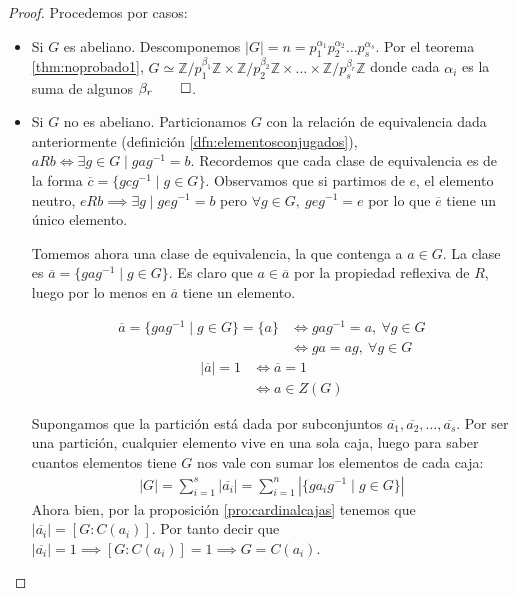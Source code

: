 \documentclass{book}
\theoremstyle{definition}
\theoremstyle{remark}
\newcommand{\inv}[1]{#1^{-1}}
\newcommand{\isom}{\simeq}
\newcommand{\Z}{\mathbb{Z}}
\begin{document}
\begin{proof}
	Procedemos por casos:
	\begin{itemize}
		\item Si $G$ es abeliano. Descomponemos $|G| = n = p_1^{\alpha_1}p_2^{\alpha_2}\dots p_s^{\alpha_s}$. Por el teorema \ref{thm:noprobado1}, $G \isom \Z/p_1^{\beta_1}\Z \times \Z/p_2^{\beta_2}\Z \times \dots \times \Z/p_s^{\beta_r}\Z$ donde cada $\alpha_i$ es la suma de algunos $\beta_r \qed$.
		
		\item Si $G$ no es abeliano. Particionamos $G$ con la relación de equivalencia dada anteriormente (definición \ref{dfn:elementosconjugados}), $aRb \iff \exists g \in G \mid ga\inv{g} = b$. Recordemos que cada clase de equivalencia es de la forma $\overline{c} = \{gc\inv{g} \mid g \in G\}$. Observamos que si partimos de $e$, el elemento neutro, $eRb \implies \exists g \mid ge\inv{g} = b$ pero $\forall g \in G,\ ge\inv{g} = e$ por lo que $\overline{e}$ tiene un único elemento.
		
		Tomemos ahora una clase de equivalencia, la que contenga a $a \in G$. La clase es $\overline{a} = \{ga\inv{g} \mid g \in G\}$. Es claro que $a \in \overline{a}$ por la propiedad reflexiva de $R$, luego por lo menos en $\overline{a}$ tiene un elemento.
		
		\begin{align*}
			\overline{a} = \{ga\inv{g} \mid g \in G\} = \{a\} &\iff ga\inv{g} = a,\ \forall g \in G \\
			&\iff ga = ag,\ \forall g \in G
		\end{align*}
		\begin{align*}
			|\overline{a}| = 1 &\iff \overline{a} = 1 \\
			&\iff a \in Z(G)
		\end{align*}
		
		Supongamos que la partición está dada por subconjuntos $\overline{a_1}, \overline{a_2}, \dots, \overline{a_s}$. Por ser una partición, cualquier elemento vive en una sola caja, luego para saber cuantos elementos tiene $G$ nos vale con sumar los elementos de cada caja:
		\begin{align*}
			|G| = \sum_{i = 1}^{s} |\overline{a_i}| = \sum_{i = 1}^n |\{ga_i\inv{g} \mid g \in G\}|
		\end{align*}
		Ahora bien, por la proposición \ref{pro:cardinalcajas} tenemos que $|\overline{a_i}| = [G:C(a_i)]$. Por tanto decir que $|\overline{a_i}| = 1 \implies [G:C(a_i)] = 1 \implies G = C(a_i)$.
		

\end{itemize}
\end{proof}
\end{document}
